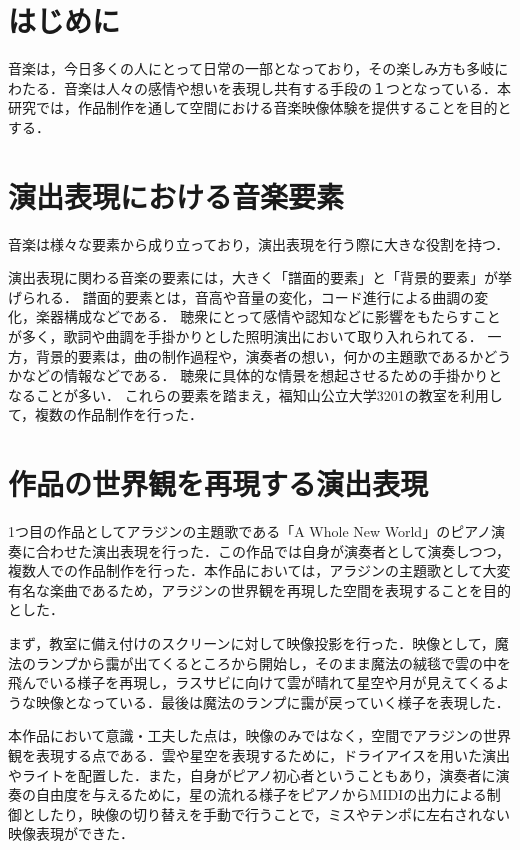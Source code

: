 

\section{はじめに}
音楽は，今日多くの人にとって日常の一部となっており，その楽しみ方も多岐にわたる．音楽は人々の感情や想いを表現し共有する手段の１つとなっている．本研究では，作品制作を通して空間における音楽映像体験を提供することを目的とする．

\section{演出表現における音楽要素}
音楽は様々な要素から成り立っており，演出表現を行う際に大きな役割を持つ．

演出表現に関わる音楽の要素には，大きく「譜面的要素」と「背景的要素」が挙げられる．
譜面的要素とは，音高や音量の変化，コード進行による曲調の変化，楽器構成などである．
聴衆にとって感情や認知などに影響をもたらすことが多く，歌詞や曲調を手掛かりとした照明演出において取り入れられてる\cite{Kanno22}．
一方，背景的要素は，曲の制作過程や，演奏者の想い，何かの主題歌であるかどうかなどの情報などである．
聴衆に具体的な情景を想起させるための手掛かりとなることが多い．
これらの要素を踏まえ，福知山公立大学3201の教室を利用して，複数の作品制作を行った．

\section{作品の世界観を再現する演出表現}
1つ目の作品としてアラジンの主題歌である「A Whole New World」\cite{Aladdin}のピアノ演奏に合わせた演出表現を行った．この作品では自身が演奏者として演奏しつつ，複数人での作品制作を行った．本作品においては，アラジンの主題歌として大変有名な楽曲であるため，アラジンの世界観を再現した空間を表現することを目的とした．

まず，教室に備え付けのスクリーンに対して映像投影を行った．映像として，魔法のランプから靄が出てくるところから開始し，そのまま魔法の絨毯で雲の中を飛んでいる様子を再現し，ラスサビに向けて雲が晴れて星空や月が見えてくるような映像となっている．最後は魔法のランプに靄が戻っていく様子を表現した．

本作品において意識・工夫した点は，映像のみではなく，空間でアラジンの世界観を表現する点である．雲や星空を表現するために，ドライアイスを用いた演出やライトを配置した．また，自身がピアノ初心者ということもあり，演奏者に演奏の自由度を与えるために，星の流れる様子をピアノからMIDIの出力による制御としたり，映像の切り替えを手動で行うことで，ミスやテンポに左右されない映像表現ができた．

